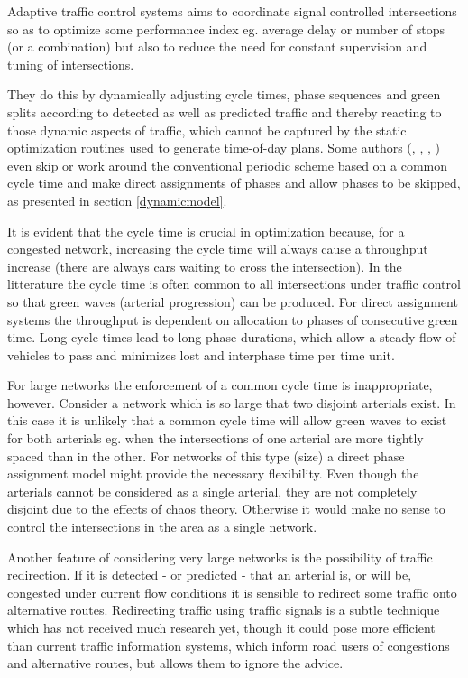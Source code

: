 \label{adaptive_cooperation}
Adaptive traffic control systems aims to coordinate signal controlled intersections so as to optimize some performance index eg. average delay or number of stops (or a combination) but also to reduce the need for constant supervision and tuning of intersections.

They do this by dynamically adjusting cycle times, phase sequences and green splits according to detected as well as predicted traffic and thereby reacting to those dynamic aspects of traffic, which cannot be captured by the static optimization routines used to generate time-of-day plans. Some authors (\cite{1}, \cite{44}, \cite{46}, \cite{scoot2004}) even skip or work around the conventional periodic scheme based on a common cycle time and make direct assignments of phases and allow phases to be skipped, as presented in section \ref{dynamicmodel}. 

It is evident that the cycle time is crucial in optimization because, for a congested network, increasing the cycle time will always cause a throughput increase (there are always cars waiting to cross the intersection). In the litterature the cycle time is often common to all intersections under traffic control so that green waves (arterial progression) can be produced. For direct assignment systems the throughput is dependent on allocation to phases of consecutive green time. Long cycle times lead to long phase durations, which allow a steady flow of vehicles to pass and minimizes lost and interphase time per time unit.

For large networks the enforcement of a common cycle time is inappropriate, however. Consider a network which is so large that two disjoint arterials exist. In this case it is unlikely that a common cycle time will allow green waves to exist for both arterials eg. when the intersections of one arterial are more tightly spaced than in the other. For networks of this type (size) a direct phase assignment model might provide the necessary flexibility. Even though the arterials cannot be considered as a single arterial, they are not completely disjoint due to the effects of chaos theory. Otherwise it would make no sense to control the intersections in the area as  a single network.

Another feature of considering very large networks is the possibility of traffic redirection. If it is detected - or predicted - that an arterial is, or will be, congested under current flow conditions it is sensible to redirect some traffic onto alternative routes. 
Redirecting traffic using traffic signals is a subtle technique which has not received much research yet, though it could pose more efficient than current traffic information systems, which inform road users of congestions and alternative routes, but allows them to ignore the advice.

